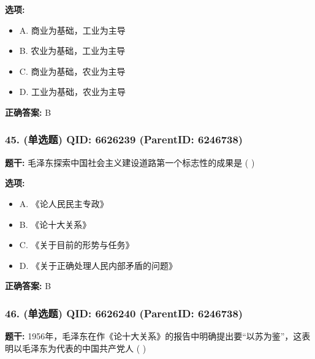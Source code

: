 \documentclass[12pt,UTF8]{ctexart}
\begin{document}
\textbf{选项:}
\begin{itemize}[leftmargin=*]

  \item A. 商业为基础，工业为主导

  \item B. 农业为基础，工业为主导

  \item C. 商业为基础，农业为主导

  \item D. 工业为基础，农业为主导

\end{itemize}

\textbf{正确答案:}
B

\vspace{0.3em}\hrulefill\vspace{0.7em}

\subsubsection*{45. (单选题) \small QID: 6626239 (ParentID: 6246738)}

\textbf{题干:}
毛泽东探索中国社会主义建设道路第一个标志性的成果是  ( )



\textbf{选项:}
\begin{itemize}[leftmargin=*]

  \item A. 《论人民民主专政》

  \item B. 《论十大关系》

  \item C. 《关于目前的形势与任务》

  \item D. 《关于正确处理人民内部矛盾的问题》

\end{itemize}

\textbf{正确答案:}
B

\vspace{0.3em}\hrulefill\vspace{0.7em}

\subsubsection*{46. (单选题) \small QID: 6626240 (ParentID: 6246738)}

\textbf{题干:}
1956年，毛泽东在作《论十大关系》的报告中明确提出要“以苏为鉴”，这表明以毛泽东为代表的中国共产党人  ( )
\end{document}
